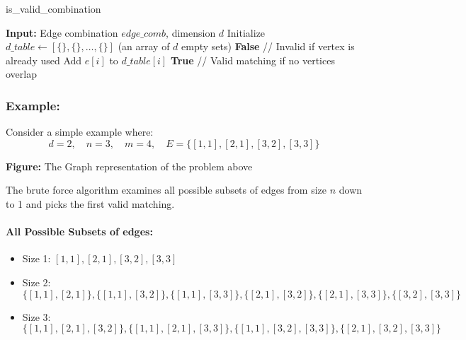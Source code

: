 \begin{algorithm}
\caption{is\_valid\_combination}
\begin{algorithmic}
\STATE \textbf{Input:} Edge combination $\textit{edge\_comb}$, dimension $d$
\STATE Initialize $d\_table \gets [\{\}, \{\}, \dots, \{\}]$ (an array of $d$ empty sets)
            \RETURN \textbf{False} \hfill // Invalid if vertex is already used
        \ENDIF
        \STATE Add $e[i]$ to $d\_table[i]$
    \ENDFOR
\ENDFOR
\RETURN \textbf{True} \hfill // Valid matching if no vertices overlap
\end{algorithmic}
\end{algorithm}



\subsubsection*{Example:}


Consider a simple example where:
\[
d = 2, \quad n = 3, \quad m = 4, \quad E = \{ [1, 1], [2, 1], [3, 2], [3, 3] \}
\]

\begin{center}
\end{center}
\begin{center}
    \textbf{Figure:} The Graph representation of the problem above
\end{center}

The brute force algorithm examines all possible subsets of edges from size \( n \) down to 1 and picks the first valid matching.


\paragraph{All Possible Subsets of edges:}
\begin{itemize}
    \item Size 1: \([1, 1], [2, 1], [3, 2], [3, 3]\)
    \item Size 2: \(\{[1, 1], [2, 1]\}, \{[1, 1], [3, 2]\}, \{[1, 1], [3, 3]\}, \{[2, 1], [3, 2]\}, \{[2, 1], [3, 3]\}, \{[3, 2], [3, 3]\}\)
    \item Size 3: \(\{[1, 1], [2, 1], [3, 2]\}, \{[1, 1], [2, 1], [3, 3]\}, \{[1, 1], [3, 2], [3, 3]\}, \{[2, 1], [3, 2], [3, 3]\}\)
\end{itemize}

